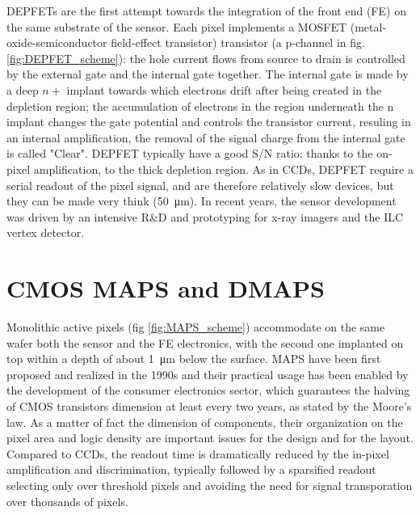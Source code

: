    DEPFETs are the first attempt towards the integration of the front end (FE) on the same substrate of the sensor.
   Each pixel implements a MOSFET (metal-oxide-semiconductor field-effect transistor) transistor (a p-channel in fig. \ref{fig:DEPFET_scheme}): the hole current flows from source to drain is controlled by the external gate and the internal gate together. The internal gate is made by a deep $n+$ implant towards which electrons drift after being created in the depletion region; the accumulation of electrons in the region underneath the n implant changes the gate potential and controls the transistor current, resuling in an internal amplification, the removal of the signal charge from the internal gate is called "Clear". 
   DEPFET typically have a good S/N ratio: thanks to the on-pixel amplification, to the thick depletion region. 
   As in CCDs, DEPFET require a serial readout of the pixel signal, and are therefore relatively slow devices, but they can be made very think (\SI{50}{\um}).
   In recent years, the sensor development was driven by an intensive R$\&$D and prototyping for x-ray imagers and the ILC vertex detector. 
   

\section{CMOS MAPS and DMAPS}\label{sec:MAPS_DMAPS}
   Monolithic active pixels (fig \ref{fig:MAPS_scheme}) accommodate on the same wafer both the sensor and the FE electronics, with the second one implanted on top within a depth of about \SI{1}{\um} below the surface. 
   MAPS have been first proposed and realized in the 1990s and their practical usage has been enabled by the development of the consumer electronics sector, which guarantees the halving of CMOS transistors dimension at least every two years, as stated by the Moore's law.
   As a matter of fact the dimension of components, their organization on the pixel area and logic density are important issues for the design and for the layout.
   Compared to CCDs, the readout time is dramatically reduced by the in-pixel amplification and discrimination, typically followed by a sparsified readout selecting only over threshold pixels and avoiding the need for signal transporation over thousands of pixels.

